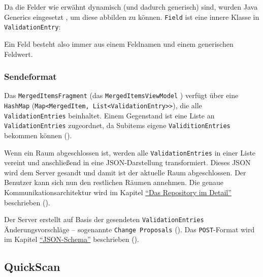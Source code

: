 Da die Felder wie erwähnt dynamisch (und dadurch generisch) sind, wurden
Java Generics eingesetzt \cite{java-generics}, um diese abbilden zu
können. \texttt{Field} ist eine innere Klasse in
\texttt{ValidationEntry}:

\begin{Shaded}
\begin{Highlighting}[]
   
     
\end{Highlighting}
\end{Shaded}

Ein Feld besteht also immer aus einem Feldnamen und einem generischen
Feldwert.

\hypertarget{sendeformat}{%
\subsubsection{Sendeformat}\label{sendeformat}}

Das \texttt{MergedItemsFragment} (\bzw das \texttt{MergedItemsViewModel}
) verfügt über eine \texttt{HashMap}
(\texttt{Map\textless{}MergedItem,\ List\textless{}ValidationEntry\textgreater{}\textgreater{}}),
die alle \texttt{ValidationEntries} beinhaltet. Einem Gegenstand ist
eine Liste an \texttt{ValidationEntries} zugeordnet, da Subitems eigene
\texttt{ValiditionEntries} bekommen können
().

Wenn ein Raum abgeschlossen ist, werden alle \texttt{ValidationEntries}
in einer Liste vereint und anschließend in eine JSON-Darstellung
transformiert. Dieses JSON wird dem Server gesandt und damit ist der
aktuelle Raum abgeschlossen. Der Benutzer kann sich nun den restlichen
Räumen annehmen. Die genaue Kommunikationsarchitektur wird im Kapitel
\protect\hyperlink{das-repository-im-detaila}{``Das Repository im
Detail''} beschrieben ().

Der Server erstellt auf Basis der gesendeten \texttt{ValidationEntries}
Änderungsvorschläge -- sogenannte \texttt{Change\ Proposals}
(). Das \texttt{POST}-Format wird im
Kapitel \protect\hyperlink{json-schema}{``JSON-Schema''} beschrieben
().

\hypertarget{quickscan}{%
\subsection{QuickScan}\label{quickscan}}

